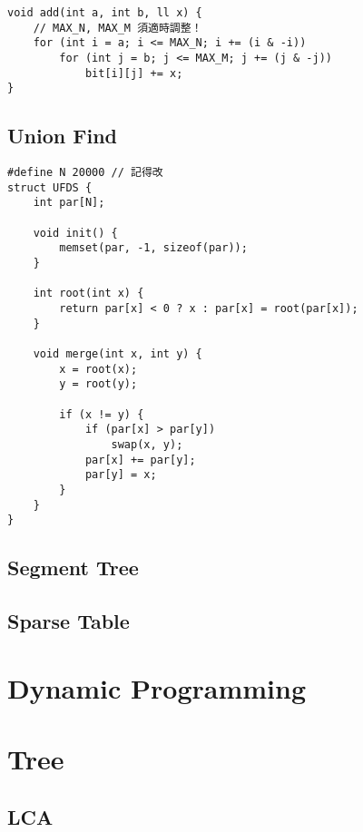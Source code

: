 \documentclass[10pt,oneside]{article}
\begin{document}
\begin{landscape}
\begin{multicols}{2}
\begin{lstlisting}
void add(int a, int b, ll x) {
	// MAX_N, MAX_M 須適時調整！
    for (int i = a; i <= MAX_N; i += (i & -i))
        for (int j = b; j <= MAX_M; j += (j & -j))
            bit[i][j] += x;
}
\end{lstlisting}

\subsection{Union Find}

\begin{lstlisting}
#define N 20000 // 記得改
struct UFDS {
    int par[N];

    void init() {
        memset(par, -1, sizeof(par));
    }

    int root(int x) {
        return par[x] < 0 ? x : par[x] = root(par[x]);
    }

    void merge(int x, int y) {
        x = root(x);
        y = root(y);

        if (x != y) {
            if (par[x] > par[y])
                swap(x, y);
            par[x] += par[y];
            par[y] = x;
        }
    }
}
\end{lstlisting}

\subsection{Segment Tree}

\subsection{Sparse Table}



\section{Dynamic Programming}


\section{Tree}

\subsection{LCA}



\end{multicols}
\end{landscape}
\end{document}
